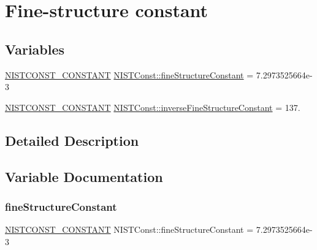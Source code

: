 \hypertarget{group___n_i_s_t_const-_fine_structure_constant}{}\section{Fine-\/structure constant}
\label{group___n_i_s_t_const-_fine_structure_constant}
\subsection*{Variables}
\begin{DoxyCompactItemize}
\item 
\mbox{\hyperlink{group___n_i_s_t_const-_macros_ga2b0fc1d7452373f816175dd86ce26729}{N\+I\+S\+T\+C\+O\+N\+S\+T\+\_\+\+C\+O\+N\+S\+T\+A\+NT}} \mbox{\hyperlink{group___n_i_s_t_const-_fine_structure_constant_ga67cf20054caf1e81add883470b89db51}{N\+I\+S\+T\+Const\+::fine\+Structure\+Constant}} = 7.\+2973525664e-\/3
\item 
\mbox{\hyperlink{group___n_i_s_t_const-_macros_ga2b0fc1d7452373f816175dd86ce26729}{N\+I\+S\+T\+C\+O\+N\+S\+T\+\_\+\+C\+O\+N\+S\+T\+A\+NT}} \mbox{\hyperlink{group___n_i_s_t_const-_fine_structure_constant_gab0b66cc7e11797dce82219a024123a12}{N\+I\+S\+T\+Const\+::inverse\+Fine\+Structure\+Constant}} = 137.
\end{DoxyCompactItemize}


\subsection{Detailed Description}


\subsection{Variable Documentation}
\mbox{\label{group___n_i_s_t_const-_fine_structure_constant_ga67cf20054caf1e81add883470b89db51}} 
\subsubsection{\texorpdfstring{fine\+Structure\+Constant}{fineStructureConstant}}
{\footnotesize\ttfamily \mbox{\hyperlink{group___n_i_s_t_const-_macros_ga2b0fc1d7452373f816175dd86ce26729}{N\+I\+S\+T\+C\+O\+N\+S\+T\+\_\+\+C\+O\+N\+S\+T\+A\+NT}} N\+I\+S\+T\+Const\+::fine\+Structure\+Constant = 7.\+2973525664e-\/3}


